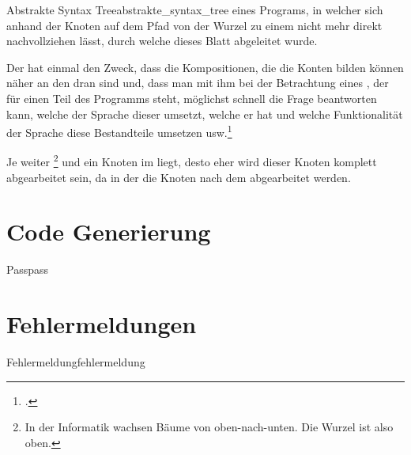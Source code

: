 \begin{Definition}{Abstrakte Syntax Tree}{abstrakte_syntax_tree}
   eines Programs, in welcher sich anhand der Knoten auf dem Pfad von der Wurzel zu einem  nicht mehr direkt nachvollziehen lässt, durch welche  dieses Blatt abgeleitet wurde.

Der  hat einmal den Zweck, dass die Kompositionen, die die Konten bilden können  näher an den  dran sind und, dass man mit ihm bei der Betrachtung eines , der für einen Teil des Programms steht, möglichst schnell die Frage beantworten kann, welche  der Sprache dieser umsetzt, welche  er hat und welche Funktionalität der Sprache diese Bestandteile umsetzen usw.\footcite{noauthor_course_2022}
\end{Definition}

  Je weiter \footnote{In der Informatik wachsen Bäume von oben-nach-unten. Die Wurzel ist also oben.} und  ein Knoten im  liegt, desto eher wird dieser Knoten komplett abgearbeitet sein, da in der  die Knoten nach dem  abgearbeitet werden.


\section{Code Generierung}
\label{sec:code_generierung}
\begin{Definition}{Pass}{pass}
\end{Definition}
\section{Fehlermeldungen}
\begin{Definition}{Fehlermeldung}{fehlermeldung}
\end{Definition}


